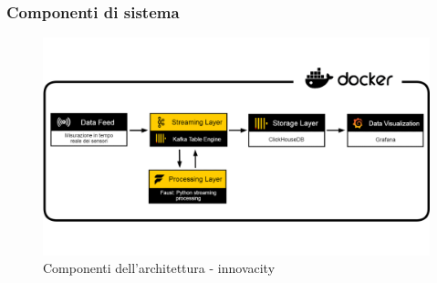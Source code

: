 \subsubsection{Componenti di sistema}
\begin{figure}[H]
    \centering
    \includegraphics[width=1\textwidth]{../Images/SpecificaTecnica/architettura.jpg}
    \caption{Componenti dell'architettura - innovacity}
    \label{fig: fdf}
\end{figure}

